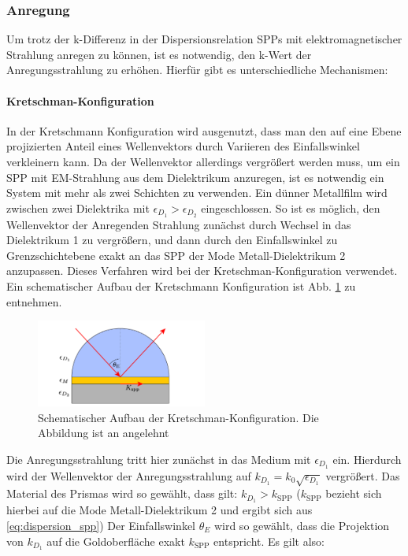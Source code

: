 \documentclass[titlepage]{article}
\begin{document}
		\subsubsection{Anregung}
			Um trotz der k-Differenz in der Dispersionsrelation SPPs mit elektromagnetischer Strahlung anregen zu können, ist es notwendig, den k-Wert der Anregungsstrahlung zu erhöhen. Hierfür gibt es unterschiedliche Mechanismen:
			\paragraph{Kretschman-Konfiguration}
			In der Kretschmann Konfiguration wird ausgenutzt, dass man den auf eine Ebene projizierten Anteil eines Wellenvektors durch Variieren des Einfallswinkel verkleinern kann. Da der Wellenvektor allerdings vergrößert werden muss, um ein SPP mit EM-Strahlung aus dem Dielektrikum anzuregen, ist es notwendig ein System mit mehr als zwei Schichten zu verwenden. Ein dünner Metallfilm wird zwischen zwei Dielektrika mit $\epsilon_{D_1} > \epsilon_{D_2}$ eingeschlossen. So ist es möglich, den Wellenvektor der Anregenden Strahlung zunächst durch Wechsel in das Dielektrikum 1 zu vergrößern, und dann durch den Einfallswinkel zu Grenzschichtebene exakt an das SPP der Mode Metall-Dielektrikum 2 anzupassen. Dieses Verfahren wird bei der Kretschman-Konfiguration verwendet. Ein schematischer Aufbau der Kretschmann Konfiguration ist Abb. \ref{fig:kretschman} zu entnehmen.
				\begin{figure}[h] 
				\centering
				\includegraphics[width=0.5\textwidth]{figures/Kretschmann.pdf}
				\caption{Schematischer Aufbau der Kretschman-Konfiguration. Die Abbildung ist an \cite{Jaruschewski.2020} angelehnt}
				\label{fig:kretschman}
				\end{figure}
			Die Anregungsstrahlung tritt hier zunächst in das Medium mit $\epsilon_{D_1}$ ein. Hierdurch wird der Wellenvektor der Anregungsstrahlung auf $k_{D_1}=k_0\sqrt{\epsilon_{D_1}}$ vergrößert. Das Material des Prismas wird so gewählt, dass gilt:  $k_{D_1}> k_{\mathrm{SPP}}$ ($k_{\mathrm{SPP}}$ bezieht sich hierbei auf die Mode Metall-Dielektrikum 2 und ergibt sich aus \eqref{eq:dispersion_spp}) Der Einfallswinkel $\theta_E$ wird so gewählt, dass die Projektion von $k_{D_1}$ auf die Goldoberfläche exakt $k_{\mathrm{SPP}}$ entspricht. Es gilt also:
\end{document}
